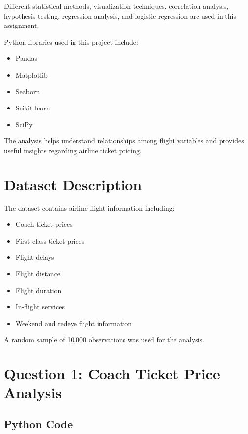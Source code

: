 \documentclass[12pt,a4paper]{article}
\begin{document}
Different statistical methods, visualization techniques, correlation analysis, hypothesis testing, regression analysis, and logistic regression are used in this assignment.

Python libraries used in this project include:

\begin{itemize}
    \item Pandas
    \item Matplotlib
    \item Seaborn
    \item Scikit-learn
    \item SciPy
\end{itemize}

The analysis helps understand relationships among flight variables and provides useful insights regarding airline ticket pricing.

\section{Dataset Description}

The dataset contains airline flight information including:

\begin{itemize}
    \item Coach ticket prices
    \item First-class ticket prices
    \item Flight delays
    \item Flight distance
    \item Flight duration
    \item In-flight services
    \item Weekend and redeye flight information
\end{itemize}

A random sample of 10,000 observations was used for the analysis.

\section{Question 1: Coach Ticket Price Analysis}

\subsection{Python Code}
\end{document}

